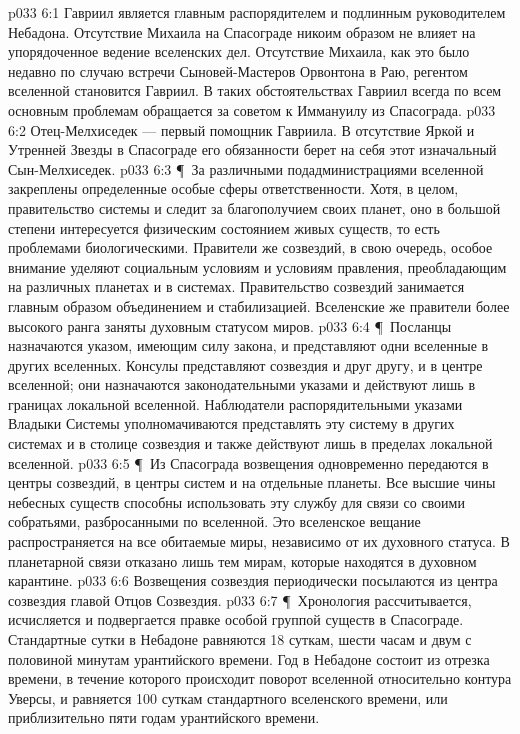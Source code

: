 \vs p033 6:1 Гавриил является главным распорядителем и подлинным руководителем Небадона. Отсутствие Михаила на Спасограде никоим образом не влияет на упорядоченное ведение вселенских дел. Отсутствие Михаила, как это было недавно по случаю встречи Сыновей\hyp{}Мастеров Орвонтона в Раю, регентом вселенной становится Гавриил. В таких обстоятельствах Гавриил всегда по всем основным проблемам обращается за советом к Иммануилу из Спасограда.
\vs p033 6:2 Отец\hyp{}Мелхиседек --- первый помощник Гавриила. В отсутствие Яркой и Утренней Звезды в Спасограде его обязанности берет на себя этот изначальный Сын\hyp{}Мелхиседек.
\vs p033 6:3 \P\ За различными подадминистрациями вселенной закреплены определенные особые сферы ответственности. Хотя, в целом, правительство системы и следит за благополучием своих планет, оно в большой степени интересуется физическим состоянием живых существ, то есть проблемами биологическими. Правители же созвездий, в свою очередь, особое внимание уделяют социальным условиям и условиям правления, преобладающим на различных планетах и в системах. Правительство созвездий занимается главным образом объединением и стабилизацией. Вселенские же правители более высокого ранга заняты духовным статусом миров.
\vs p033 6:4 \P\ Посланцы назначаются указом, имеющим силу закона, и представляют одни вселенные в других вселенных. Консулы представляют созвездия и друг другу, и в центре вселенной; они назначаются законодательными указами и действуют лишь в границах локальной вселенной. Наблюдатели распорядительными указами Владыки Системы уполномачиваются представлять эту систему в других системах и в столице созвездия и также действуют лишь в пределах локальной вселенной.
\vs p033 6:5 \P\ Из Спасограда возвещения одновременно передаются в центры созвездий, в центры систем и на отдельные планеты. Все высшие чины небесных существ способны использовать эту службу для связи со своими собратьями, разбросанными по вселенной. Это вселенское вещание распространяется на все обитаемые миры, независимо от их духовного статуса. В планетарной связи отказано лишь тем мирам, которые находятся в духовном карантине.
\vs p033 6:6 Возвещения созвездия периодически посылаются из центра созвездия главой Отцов Созвездия.
\vs p033 6:7 \P\ Хронология рассчитывается, исчисляется и подвергается правке особой группой существ в Спасограде. Стандартные сутки в Небадоне равняются 18 суткам, шести часам и двум с половиной минутам урантийского времени. Год в Небадоне состоит из отрезка времени, в течение которого происходит поворот вселенной относительно контура Уверсы, и равняется 100 суткам стандартного вселенского времени, или приблизительно пяти годам урантийского времени.
